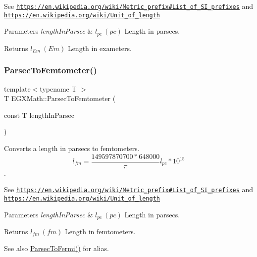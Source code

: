 See \href{https://en.wikipedia.org/wiki/Metric_prefix#List_of_SI_prefixes}{\tt https\+://en.\+wikipedia.\+org/wiki/\+Metric\+\_\+prefix\#\+List\+\_\+of\+\_\+\+S\+I\+\_\+prefixes} and \href{https://en.wikipedia.org/wiki/Unit_of_length}{\tt https\+://en.\+wikipedia.\+org/wiki/\+Unit\+\_\+of\+\_\+length} 
\begin{DoxyParams}{Parameters}
{\em length\+In\+Parsec} & $ l_{pc}\ (pc)$ Length in parsecs. \\
\hline
\end{DoxyParams}
\begin{DoxyReturn}{Returns}
$ l_{Em}\ (Em)$ Length in exameters. 
\end{DoxyReturn}
\mbox{\label{group___e_g_x_math-_conversions-_length_conversions-_astronomical-_parsec-_s_i_ga6b6fd844f1af67b873c629f579a8b9ec}} 
\subsubsection{\texorpdfstring{Parsec\+To\+Femtometer()}{ParsecToFemtometer()}}
{\footnotesize\ttfamily template$<$typename T $>$ \\
T E\+G\+X\+Math\+::\+Parsec\+To\+Femtometer (\begin{DoxyParamCaption}\item[{const T}]{length\+In\+Parsec }\end{DoxyParamCaption})}



Converts a length in parsecs to femtometers. \[ l_{fm}=\frac{149597870700 * 648000}{\pi}l_{pc} * 10^{15} \]. 

See \href{https://en.wikipedia.org/wiki/Metric_prefix#List_of_SI_prefixes}{\tt https\+://en.\+wikipedia.\+org/wiki/\+Metric\+\_\+prefix\#\+List\+\_\+of\+\_\+\+S\+I\+\_\+prefixes} and \href{https://en.wikipedia.org/wiki/Unit_of_length}{\tt https\+://en.\+wikipedia.\+org/wiki/\+Unit\+\_\+of\+\_\+length} 
\begin{DoxyParams}{Parameters}
{\em length\+In\+Parsec} & $ l_{pc}\ (pc)$ Length in parsecs. \\
\hline
\end{DoxyParams}
\begin{DoxyReturn}{Returns}
$ l_{fm}\ (fm)$ Length in femtometers. 
\end{DoxyReturn}
\begin{DoxySeeAlso}{See also}
\mbox{\hyperlink{group___e_g_x_math-_conversions-_length_conversions-_astronomical-_parsec-_non-_s_i_gac157e45cbd0a0ef15a52dcc59a7b40ad}{Parsec\+To\+Fermi()}} for alias. 
\end{DoxySeeAlso}
\mbox{\label{group___e_g_x_math-_conversions-_length_conversions-_astronomical-_parsec-_s_i_ga8b4677ca02eae3ff100d1cdca6ae2392}} 

